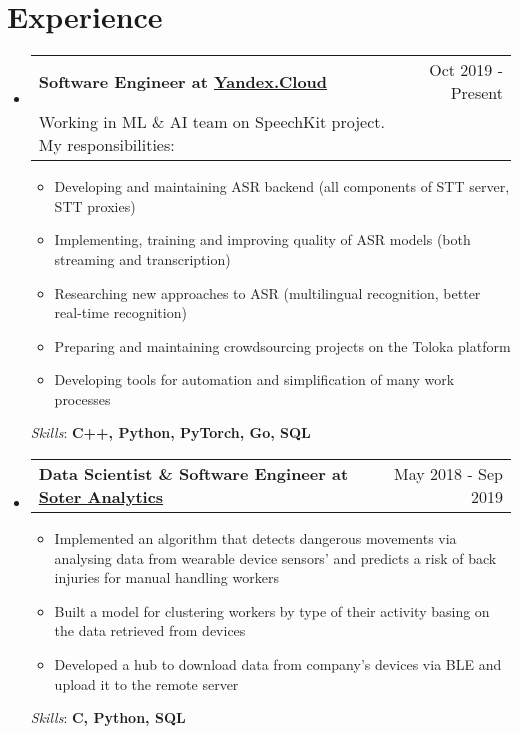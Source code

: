 \documentclass[letterpaper,11pt]{article}
\makeatletter
\newcommand{\simpleHeading}[2]{
    \begin{tabular*}{0.97\textwidth}[t]{l@{\extracolsep{\fill}}r}
      #1 & #2 \\
    \end{tabular*}\vspace{-5pt}
}
\newcommand{\simpleItemHeading}[2]{
  \vspace{-1pt}\item
    \begin{tabular*}{0.97\textwidth}[t]{l@{\extracolsep{\fill}}r}
      {\large #1} & #2 \\
    \end{tabular*}\vspace{-5pt}
}
\newcommand{\descItemHeading}[3]{
  \vspace{-1pt}\item
    \begin{tabular*}{0.97\textwidth}[t]{l@{\extracolsep{\fill}}r}
      {\large #1} & #2 \\
      #3 & \\
    \end{tabular*}\vspace{-5pt}
}
\makeatother
\begin{document}
\section{Experience}
  \begin{itemize}[leftmargin=*]
    \descItemHeading
      {\textbf{Software Engineer at \href{https://cloud.yandex.com/en/about}{Yandex.Cloud}}}{Oct 2019 - Present}
      {Working in ML \& AI team on SpeechKit project. My responsibilities:}
      \begin{itemize}
          \item Developing and maintaining ASR backend (all components of STT server, STT proxies)
          \item Implementing, training and improving quality of ASR models (both streaming and transcription)
          \item Researching new approaches to ASR (multilingual recognition, better real-time recognition)
          \item Preparing and maintaining crowdsourcing projects on the Toloka platform 
          \item Developing tools for automation and simplification of many work processes
      \end{itemize}\vspace{-5pt}
      \textit{Skills}: \textbf{C++, Python, PyTorch, Go, SQL}
     
    \vspace{-5pt}
     
    \simpleItemHeading
      {\textbf{Data Scientist \& Software Engineer at \href{https://soteranalytics.com/about-us}{Soter Analytics}}}{May 2018 - Sep 2019}
      \begin{itemize}
          \item Implemented an algorithm that detects dangerous movements via analysing data from wearable device sensors’ and predicts a risk of back injuries for manual handling workers
          \item Built a model for clustering workers by type of their activity basing on the data retrieved from devices
          \item Developed a hub to download data from company’s devices via BLE and upload it to the remote server
      \end{itemize}\vspace{-5pt}
      \textit{Skills}: \textbf{C, Python, SQL}


  \end{itemize}
\end{document}
